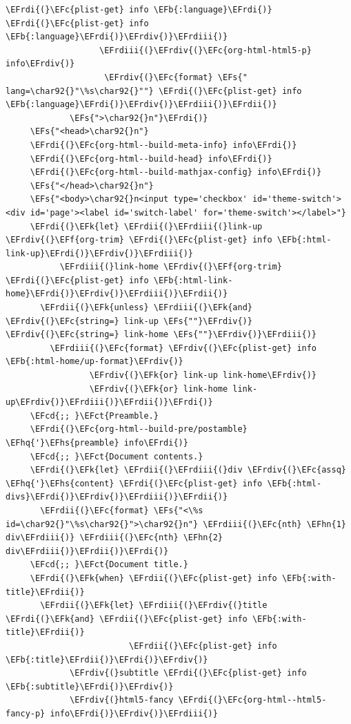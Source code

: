 \documentclass{scrartcl}
\newcommand{\EFk}[1]{\textcolor{EFk}{#1}} %
\newcommand{\EFs}[1]{\textcolor{EFs}{#1}} %
\newcommand{\EFb}[1]{\textcolor{EFb}{#1}} %
\newcommand{\EFct}[1]{\textcolor{EFct}{#1}} %
\newcommand{\EFc}[1]{\textcolor{EFc}{#1}} %
\newcommand{\EFf}[1]{\textcolor{EFf}{#1}} %
\newcommand{\EFcd}[1]{\textcolor{EFcd}{#1}} %
\newcommand{\EFhn}[1]{\textcolor{EFhn}{\textbf{#1}}} %
\newcommand{\EFhq}[1]{\textcolor{EFhq}{#1}} %
\newcommand{\EFhs}[1]{\textcolor{EFhs}{#1}} %
\newcommand{\EFrdi}[1]{\textcolor{EFrdi}{#1}} %
\newcommand{\EFrdii}[1]{\textcolor{EFrdii}{#1}} %
\newcommand{\EFrdiii}[1]{\textcolor{EFrdiii}{#1}} %
\newcommand{\EFrdiv}[1]{\textcolor{EFrdiv}{#1}} %
\begin{document}
\begin{Code}
\begin{Verbatim}[]
                     \EFrdi{(}\EFc{plist-get} info \EFb{:language}\EFrdi{)} \EFrdi{(}\EFc{plist-get} info \EFb{:language}\EFrdi{)}\EFrdiv{)}\EFrdiii{)}
                   \EFrdiii{(}\EFrdiv{(}\EFc{org-html-html5-p} info\EFrdiv{)}
                    \EFrdiv{(}\EFc{format} \EFs{" lang=\char92{}"\%s\char92{}""} \EFrdi{(}\EFc{plist-get} info \EFb{:language}\EFrdi{)}\EFrdiv{)}\EFrdiii{)}\EFrdii{)}
             \EFs{">\char92{}n"}\EFrdi{)}
     \EFs{"<head>\char92{}n"}
     \EFrdi{(}\EFc{org-html--build-meta-info} info\EFrdi{)}
     \EFrdi{(}\EFc{org-html--build-head} info\EFrdi{)}
     \EFrdi{(}\EFc{org-html--build-mathjax-config} info\EFrdi{)}
     \EFs{"</head>\char92{}n"}
     \EFs{"<body>\char92{}n<input type='checkbox' id='theme-switch'><div id='page'><label id='switch-label' for='theme-switch'></label>"}
     \EFrdi{(}\EFk{let} \EFrdii{(}\EFrdiii{(}link-up \EFrdiv{(}\EFf{org-trim} \EFrdi{(}\EFc{plist-get} info \EFb{:html-link-up}\EFrdi{)}\EFrdiv{)}\EFrdiii{)}
           \EFrdiii{(}link-home \EFrdiv{(}\EFf{org-trim} \EFrdi{(}\EFc{plist-get} info \EFb{:html-link-home}\EFrdi{)}\EFrdiv{)}\EFrdiii{)}\EFrdii{)}
       \EFrdii{(}\EFk{unless} \EFrdiii{(}\EFk{and} \EFrdiv{(}\EFc{string=} link-up \EFs{""}\EFrdiv{)} \EFrdiv{(}\EFc{string=} link-home \EFs{""}\EFrdiv{)}\EFrdiii{)}
         \EFrdiii{(}\EFc{format} \EFrdiv{(}\EFc{plist-get} info \EFb{:html-home/up-format}\EFrdiv{)}
                 \EFrdiv{(}\EFk{or} link-up link-home\EFrdiv{)}
                 \EFrdiv{(}\EFk{or} link-home link-up\EFrdiv{)}\EFrdiii{)}\EFrdii{)}\EFrdi{)}
     \EFcd{;; }\EFct{Preamble.}
     \EFrdi{(}\EFc{org-html--build-pre/postamble} \EFhq{'}\EFhs{preamble} info\EFrdi{)}
     \EFcd{;; }\EFct{Document contents.}
     \EFrdi{(}\EFk{let} \EFrdii{(}\EFrdiii{(}div \EFrdiv{(}\EFc{assq} \EFhq{'}\EFhs{content} \EFrdi{(}\EFc{plist-get} info \EFb{:html-divs}\EFrdi{)}\EFrdiv{)}\EFrdiii{)}\EFrdii{)}
       \EFrdii{(}\EFc{format} \EFs{"<\%s id=\char92{}"\%s\char92{}">\char92{}n"} \EFrdiii{(}\EFc{nth} \EFhn{1} div\EFrdiii{)} \EFrdiii{(}\EFc{nth} \EFhn{2} div\EFrdiii{)}\EFrdii{)}\EFrdi{)}
     \EFcd{;; }\EFct{Document title.}
     \EFrdi{(}\EFk{when} \EFrdii{(}\EFc{plist-get} info \EFb{:with-title}\EFrdii{)}
       \EFrdii{(}\EFk{let} \EFrdiii{(}\EFrdiv{(}title \EFrdi{(}\EFk{and} \EFrdii{(}\EFc{plist-get} info \EFb{:with-title}\EFrdii{)}
                         \EFrdii{(}\EFc{plist-get} info \EFb{:title}\EFrdii{)}\EFrdi{)}\EFrdiv{)}
             \EFrdiv{(}subtitle \EFrdi{(}\EFc{plist-get} info \EFb{:subtitle}\EFrdi{)}\EFrdiv{)}
             \EFrdiv{(}html5-fancy \EFrdi{(}\EFc{org-html--html5-fancy-p} info\EFrdi{)}\EFrdiv{)}\EFrdiii{)}

\end{Verbatim}
\end{Code}
\end{document}
